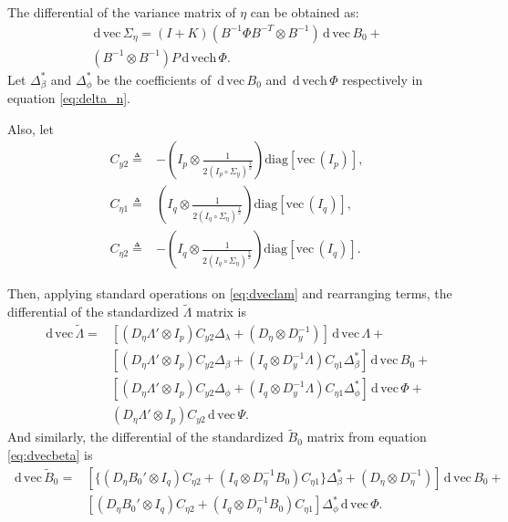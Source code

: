 \documentclass[a4paper, 11pt]{article}
\newcommand{\n}{\eta}
\renewcommand{\l}{\lambda}
\renewcommand{\b}{\beta}
\newcommand{\p}{\phi}
\renewcommand{\d}{\,\mathrm{d}\,}
\newcommand{\definedas}{\triangleq}
\newcommand{\kronprod}{\otimes}
\newcommand{\hadaprod}{\circ}
\newcommand{\diag}{\mathrm{diag}}
\renewcommand{\vec}{\mathrm{vec}\,}
\newcommand{\vech}{\mathrm{vech}\,}
\newcommand{\Lambdastan}{\tilde{\Lambda}}
\newcommand{\Bstan}{\tilde{B}}
\newcommand{\0}{\boldsymbol{0}}
\begin{document}
The differential of the variance matrix of $\n$ can be obtained as:
\begin{equation}\label{eq:delta_n}
\begin{split}
\d\vec \Sigma_\n = 
(I + K) (B^{-1} \Phi B^{-T} \kronprod  B^{-1}) \d\vec B_0
+ \\
(B^{-1} \kronprod  B^{-1}) P \d \vech \Phi.
\end{split}
\end{equation}
Let $\Delta^*_\b$ and $\Delta^*_\p$  be the coefficients of $\d\vec B_0$ and
$\d\vech\Phi$ respectively in equation \ref{eq:delta_n}.

Also, let
\begin{align}
    C_{y2} \definedas&
        - (I_p \kronprod \frac{1}{2 (I_p \hadaprod \Sigma_y)^{\frac{3}{2}}})
        \diag[\vec(I_p)],
\\
    C_{\n1} \definedas&
        (I_q \kronprod \frac{1}{2 (I_q \hadaprod \Sigma_\n)^{\frac{1}{2}}})
        \diag[\vec(I_q)],
\\
    C_{\n2} \definedas&
        - (I_q \kronprod \frac{1}{2 (I_q \hadaprod \Sigma_\n)^{\frac{3}{2}}})
        \diag[\vec(I_q)].
\end{align}

Then, applying standard operations on \ref{eq:dveclam} and rearranging terms,
the differential of the standardized $\Lambdastan$ matrix is
\begin{equation}\label{eq:dveclam_final}
\begin{split}
  \d\vec\Lambdastan = 
     & [(D_\n \Lambda' \kronprod I_p) C_{y2} \Delta_\l + 
        (D_\n \kronprod D_y^{-1})] 
        \d\vec\Lambda +\\
     & [(D_\n \Lambda' \kronprod I_p) C_{y2} \Delta_\b + 
        (I_q \kronprod D_y^{-1}\Lambda) C_{\n1} \Delta^*_\b ] 
        \d\vec B_0 +\\
     & [(D_\n \Lambda' \kronprod I_p) C_{y2} \Delta_\p + 
        (I_q \kronprod D_y^{-1}\Lambda) C_{\n1} \Delta^*_\p ] 
        \d\vec \Phi +\\
     & (D_\n \Lambda' \kronprod I_p) C_{y2} 
        \d\vec \Psi.
\end{split}\end{equation}
And similarly, the differential of the standardized $\Bstan_0$ matrix from
equation \ref{eq:dvecbeta} is
\begin{equation}\label{eq:dvecbeta_final}
\begin{split}
  \d\vec \Bstan_0 =
     & [\{(D_\n B_0' \kronprod I_q) C_{\n2}  + 
        (I_q \kronprod D_\n^{-1}B_0) C_{\n1} \} \Delta^*_\b +
           (D_\n \kronprod D_\n^{-1})  ] 
        \d\vec B_0 +\\
     & [(D_\n B_0' \kronprod I_q) C_{\n2}  + 
        (I_q \kronprod D_\n^{-1}B_0) C_{\n1} ] \Delta^*_\p 
        \d\vec \Phi.
\end{split}\end{equation}
\end{document}

